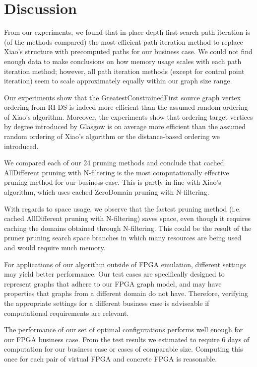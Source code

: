 \chapter{Discussion}
\label{chapter:discussion}
From our experiments, we found that in-place depth first search path iteration is (of the methods compared) the most efficient path iteration method to replace Xiao's structure with precomputed paths for our business case. We could not find enough data to make conclusions on how memory usage scales with each path iteration method; however, all path iteration methods (except for control point iteration) seem to scale approximately equally within our graph size range.

Our experiments show that the GreatestConstrainedFirst source graph vertex ordering from RI-DS \cite{RIalgorithm} is indeed more efficient than the assumed random ordering of Xiao's algorithm. Moreover, the experiments show that ordering target vertices by degree introduced by Glasgow \cite{McCreesh2015} is on average more efficient than the assumed random ordering of Xiao's algorithm or the distance-based ordering we introduced.

We compared each of our 24 pruning methods and conclude that cached AllDifferent pruning with N-filtering is the most computationally effective pruning method for our business case. This is partly in line with Xiao's algorithm, which uses cached ZeroDomain pruning with N-filtering.

With regards to space usage, we observe that the fastest pruning method (i.e. cached AllDifferent pruning with N-filtering) saves space, even though it requires caching the domains obtained through N-filtering. This could be the result of the pruner pruning search space branches in which many resources are being used and would require much memory.

For applications of our algorithm outside of FPGA emulation, different settings may yield better performance. Our test cases are specifically designed to represent graphs that adhere to our FPGA graph model, and may have properties that graphs from a different domain do not have. Therefore, verifying the appropriate settings for a different business case is adviseable if computational requirements are relevant.

The performance of our set of optimal configurations performs well enough for our FPGA business case. From the test results we estimated to require 6 days of computation for our business case or cases of comparable size. Computing this once for each pair of virtual FPGA and concrete FPGA is reasonable.

